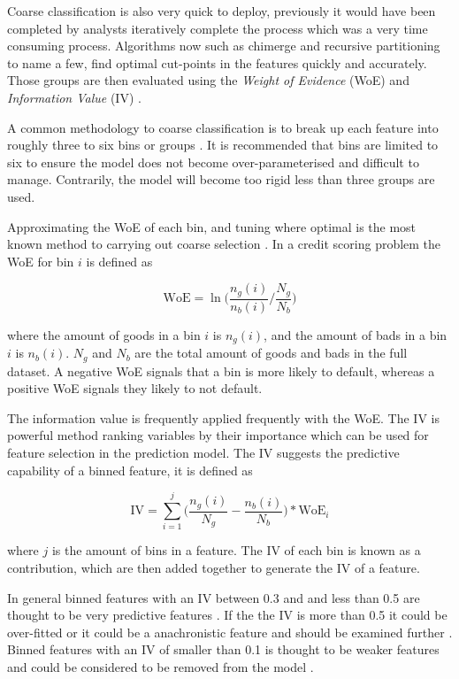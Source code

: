Coarse classification is also very quick to deploy, previously it would have been completed by analysts iteratively complete the process which was a very time consuming process. Algorithms now such as chimerge and recursive partitioning to name a few, find optimal cut-points in the features quickly and accurately. Those groups are then evaluated using the \textit{Weight of Evidence} (WoE) and \textit{Information Value} (IV) \citep{garcia_survey_2013}. 

A common methodology to coarse classification is to break up each feature into roughly three to six bins or groups \citep{hand_optimal_2005}. It is recommended that bins are limited to six to ensure the model does not become over-parameterised and difficult to manage. Contrarily, the model will become too rigid less than three groups are used. 

Approximating the WoE of each bin, and tuning where optimal is the most known method to carrying out coarse selection \citep{thomas_consumer_2009}. In a credit scoring problem the WoE for bin $i$ is defined as 
  
\begin{equation} \label{eq:woe}
\text{WoE} =  \ln\bigg(\frac{n_g(i)}{n_b(i)} \bigg/ \frac{N_g}{N_b}\bigg)
\end{equation}

where the amount of goods in a bin $i$ is $n_g(i)$, and the amount of bads in a bin $i$ is $n_b(i)$. $N_g$ and $N_b$ are the total amount of goods and bads in the full dataset. A negative WoE signals that a bin is more likely to default, whereas a positive WoE signals they likely to not default.

The information value is frequently applied frequently with the WoE. The IV is powerful method ranking variables by their importance which can be used for feature selection in the prediction model. The IV suggests the predictive capability of a binned feature, it is defined as  
 
\begin{equation} \label{eq:informatoValue}
\text{IV} =  \sum\limits_{i=1}^j \bigg(\frac{n_g(i)}{N_g} -   \frac{n_b(i)}{N_b}\bigg) * \text{WoE$_i$}
\end{equation}

where $j$ is the amount of bins in a feature. The IV of each bin is known as a contribution, which are then added together to generate the IV of a feature.

In general binned features with an IV between 0.3 and and less than 0.5 are thought to be very predictive features \citep{mays_credit_2004}. If the the IV is more than 0.5 it could be over-fitted or it could be a anachronistic feature and should be examined further \citep{si} \citep{siddiqi_credit_2012}. Binned features with an IV of smaller than 0.1 is thought to be weaker features and could be considered to be removed from the model \citep{anderson_credit_2007}.

